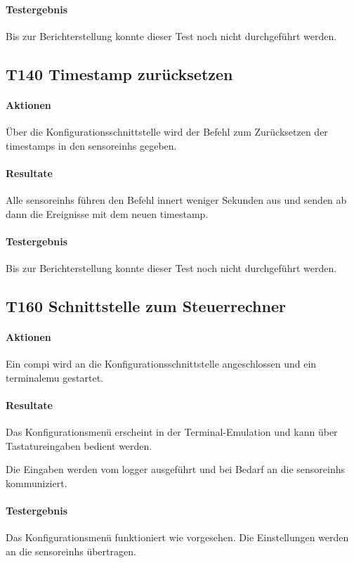 \paragraph{Testergebnis} Bis zur Berichterstellung konnte dieser Test noch nicht durchgeführt werden.

\subsection{T140 Timestamp zurücksetzen}
\paragraph{Aktionen} Über die Konfigurationsschnittstelle wird der Befehl zum Zurücksetzen der \gls{timestamp}s in den \glspl{sensoreinh} gegeben.

\paragraph{Resultate} Alle \glspl{sensoreinh} führen den Befehl innert weniger Sekunden aus und senden ab dann die Ereignisse mit dem neuen \gls{timestamp}.

\paragraph{Testergebnis} Bis zur Berichterstellung konnte dieser Test noch nicht durchgeführt werden.

\subsection{T160 Schnittstelle zum Steuerrechner}
\paragraph{Aktionen} Ein \gls{compi} wird an die Konfigurationsschnittstelle angeschlossen und ein \gls{terminalemu} gestartet.

\paragraph{Resultate} Das Konfigurationsmenü erscheint in der Terminal-Emulation und kann über Tastatureingaben bedient werden.

Die Eingaben werden vom \gls{logger} ausgeführt und bei Bedarf an die \glspl{sensoreinh} kommuniziert.

\paragraph{Testergebnis} Das Konfigurationsmenü funktioniert wie vorgesehen. Die Einstellungen werden an die \glspl{sensoreinh} übertragen.

